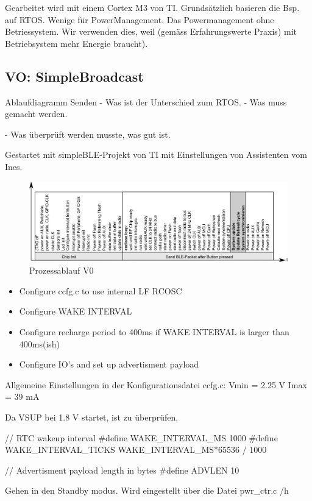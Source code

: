 Gearbeitet wird mit einem Cortex M3 von TI. 
Grundsätzlich basieren die Bsp. auf RTOS. Wenige für PowerManagement. Das Powermanagement ohne Betriessystem. Wir verwenden dies, weil (gemäss Erfahrungswerte Praxis) mit Betriebsystem mehr Energie braucht).

\subsection{VO: SimpleBroadcast}
Ablaufdiagramm Senden
- Was ist der Unterschied zum RTOS.
- Was muss gemacht werden.

- Was überprüft werden musste, was gut ist.

Gestartet mit simpleBLE-Projekt von TI mit Einstellungen von Assistenten vom Ines.

\begin{figure}
  \includegraphics[width=15cm]{../ressources/SimpleLink/V0Sendeablauf.png}
  \caption{Prozessablauf V0}
\end{figure}




\begin{itemize}
    \item Configure ccfg.c to use internal LF RCOSC
    \item Configure WAKE INTERVAL
    \item Configure recharge period to 400ms if WAKE INTERVAL is larger than 400ms(ish)
    \item Configure IO's and set up advertisment payload       
\end{itemize}

Allgemeine Einstellungen in der Konfigurationsdatei ccfg.c:
Vmin = 2.25 V
Imax = 39 mA


Da VSUP bei 1.8 V startet, ist zu überprüfen. 


// RTC wakeup interval
\#define WAKE\_INTERVAL\_MS 		1000
\#define WAKE\_INTERVAL\_TICKS 	WAKE\_INTERVAL\_MS*65536 / 1000


// Advertisment payload length in bytes
\#define ADVLEN 10


Gehen in den Standby modus. Wird eingestellt über die Datei pwr\_ctr.c /h

